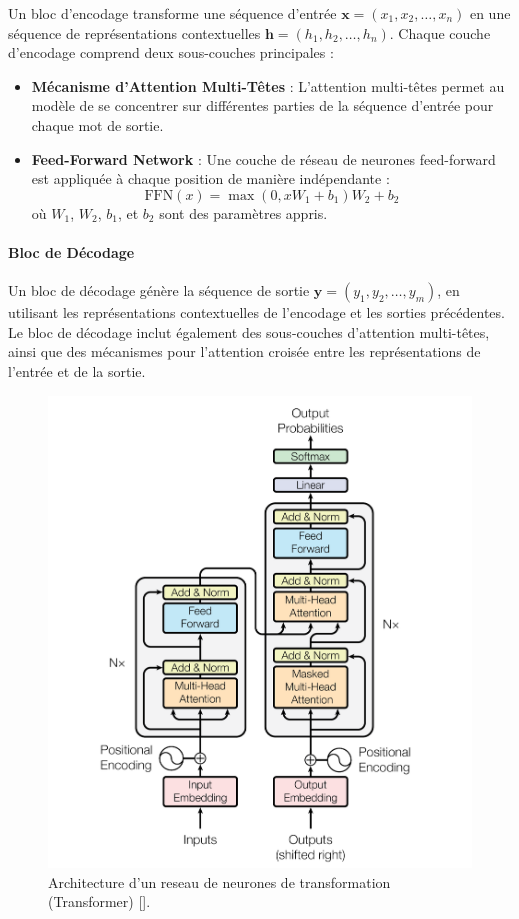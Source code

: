 Un bloc d'encodage transforme une séquence d'entrée $\mathbf{x} = (x_1, x_2,
	\ldots, x_n)$ en une séquence de représentations contextuelles $\mathbf{h} =
	(h_1, h_2, \ldots, h_n)$. Chaque couche d'encodage comprend deux sous-couches
principales :

\begin{itemize}
	\item \textbf{Mécanisme d'Attention Multi-Têtes} : L'attention multi-têtes permet au modèle de se concentrer sur différentes parties de la séquence d'entrée pour chaque mot de sortie.
	\item \textbf{Feed-Forward Network} : Une couche de réseau de neurones feed-forward est appliquée à chaque position de manière indépendante :
	      \begin{equation}
		      \text{FFN}(x) = \max(0, xW_1 + b_1)W_2 + b_2
	      \end{equation}
	      où $W_1$, $W_2$, $b_1$, et $b_2$ sont des paramètres appris.
\end{itemize}

\paragraph{Bloc de Décodage}

Un bloc de décodage génère la séquence de sortie $\mathbf{y} = (y_1, y_2,
	\ldots, y_m)$, en utilisant les représentations contextuelles de l'encodage et
les sorties précédentes. Le bloc de décodage inclut également des sous-couches
d'attention multi-têtes, ainsi que des mécanismes pour l'attention croisée
entre les représentations de l'entrée et de la sortie.

\begin{figure}[hbt!]
	\centering
	\includegraphics[width=12cm]{images_pfe/transformer-architecture.png}
	\caption{Architecture d'un reseau de neurones de transformation (Transformer) [\cite{attention_is_all_you_need}].}
	\label{fig:transformer}
\end{figure}
\FloatBarrier

